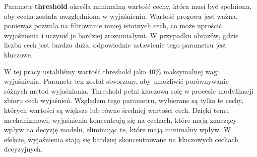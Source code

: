Parametr \textbf{threshold} określa minimalną wartość cechy, która musi być spełniona, aby cecha została uwzględniona w wyjaśnieniu.
Wartość progowa jest ważna, ponieważ pozwala na filtrowanie mniej istotnych cech, co może uprościć wyjaśnienia i uczynić je bardziej zrozumiałymi.
W przypadku obrazów, gdzie liczba cech jest bardzo duża, odpowiednie ustawienie tego parametru jest kluczowe.

W tej pracy ustaliliśmy wartość threshold jako 40\% maksymalnej wagi wyjaśnienia. 
Parametr ten został stworzony, aby umożliwić porównywanie różnych metod wyjaśniania.
Threshold pełni kluczową rolę w procesie modyfikacji zbioru cech wyjaśnień.
Względem tego parametru, wybierane są tylko te cechy, których wartości są większe lub równe średniej wartości cech.
Dzięki temu mechanizmowi, wyjaśnienia koncentrują się na cechach, które mają znaczący wpływ na decyzję modelu, eliminując te, które mają minimalny wpływ.
W efekcie, wyjaśnienia stają się bardziej skoncentrowane na kluczowych cechach decyzyjnych.

